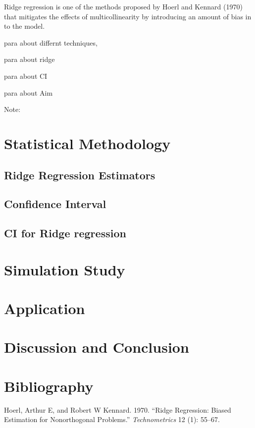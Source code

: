\documentclass[
]{interact}
\newlength{\cslhangindent}
\newenvironment{CSLReferences}[2] %
 {\begin{list}{}{%
  \setlength{\itemindent}{0pt}
  \setlength{\leftmargin}{0pt}
  \setlength{\parsep}{0pt}
  \ifodd #1
   \setlength{\leftmargin}{\cslhangindent}
   \setlength{\itemindent}{-1\cslhangindent}
  \fi
  \setlength{\itemsep}{#2\baselineskip}}}
 {\end{list}}
\begin{document}
Ridge regression is one of the methods proposed by Hoerl and Kennard
(1970) that mitigates the effects of multicollinearity by introducing an
amount of bias in to the model.

para about differnt techniques,

para about ridge

para about CI

para about Aim

Note:

\section{Statistical Methodology}\label{statistical-methodology}

\subsection{Ridge Regression
Estimators}\label{ridge-regression-estimators}

\subsection{Confidence Interval}\label{confidence-interval}

\subsection{CI for Ridge regression}\label{ci-for-ridge-regression}

\section{Simulation Study}\label{simulation-study}

\section{Application}\label{application}

\section{Discussion and Conclusion}\label{discussion-and-conclusion}

\section*{Bibliography}\label{bibliography}

\label{refs}
\begin{CSLReferences}{1}{0}
Hoerl, Arthur E, and Robert W Kennard. 1970. {``Ridge Regression: Biased
Estimation for Nonorthogonal Problems.''} \emph{Technometrics} 12 (1):
55--67.

\end{CSLReferences}
\end{document}
